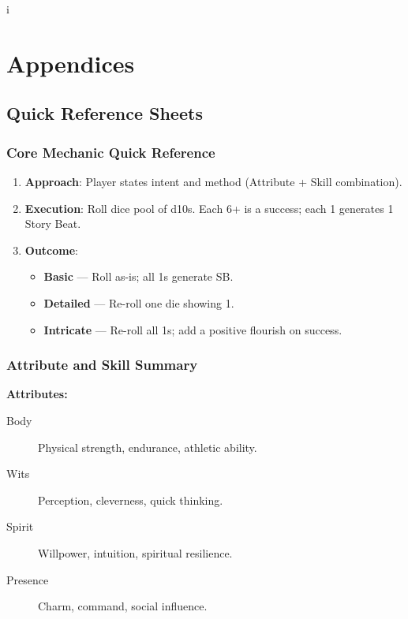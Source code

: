 i\chapter{Appendices}
\label{chap:appendices}

\renewcommand{\arraystretch}{1.15}
\newcommand{\feTableStart}{\rowcolors{2}{FeRow}{white}\small}
\newcommand{\feTableEnd}{\rowcolors{2}{}{}}

\section{Quick Reference Sheets}
\label{sec:quick-reference}

\subsection{Core Mechanic Quick Reference}
\label{subsec:core-mechanic-ref}

\begin{enumerate}
\item \textbf{Approach}: Player states intent and method (Attribute + Skill combination).
\item \textbf{Execution}: Roll dice pool of d10s. Each 6+ is a success; each 1 generates 1 Story Beat.
\item \textbf{Outcome}:
  \begin{itemize}
  \item \textbf{Basic} — Roll as-is; all 1s generate SB.
  \item \textbf{Detailed} — Re-roll one die showing 1.
  \item \textbf{Intricate} — Re-roll all 1s; add a positive flourish on success.
  \end{itemize}
\end{enumerate}

\subsection{Attribute and Skill Summary}
\label{subsec:attributes-skills-ref}

\textbf{Attributes:}
\begin{description}
\item[Body] Physical strength, endurance, athletic ability.
\item[Wits] Perception, cleverness, quick thinking.
\item[Spirit] Willpower, intuition, spiritual resilience.
\item[Presence] Charm, command, social influence.
\end{description}

